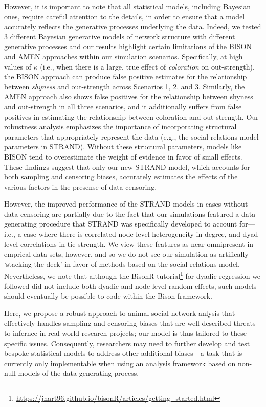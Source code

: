 \documentclass[Afour,sageh,times]{sagej}
\begin{document}
However, it is important to note that all statistical models, including Bayesian ones, require careful attention to the details, in order to ensure that a model accurately reflects the generative processes underlying the data. Indeed, we tested 3 different Bayesian generative models of network structure with different generative processes and our results highlight certain limitations of the BISON and AMEN approaches within our simulation scenarios. Specifically, at high values of $\kappa$ (i.e., when there is a large, true effect of \emph{coloration} on out-strength), the BISON approach can produce false positive estimates for the relationship between \emph{shyness} and out-strength across Scenarios 1, 2, and 3. Similarly, the AMEN approach also shows false positives for the relationship between shyness and out-strength in all three scenarios, and it additionally suffers from false positives in estimating the relationship between coloration and out-strength. Our robustness analysis emphasizes the importance of incorporating structural parameters that appropriately represent the data (e.g., the social relations model parameters in STRAND). Without these structural parameters, models like BISON tend to overestimate the weight of evidence in favor of small effects. These findings suggest that only our new STRAND model, which accounts for both sampling and censoring biases, accurately estimates the effects of the various factors in the presense of data censoring.

However, the improved performance of the STRAND models in cases without data censoring are partially due to the fact that our simulations featured a data generating procedure that STRAND was specifically developed to account for---i.e., a case where there is correlated node-level heterogeneity in degree, and dyad-level correlations in tie strength. We view these features as near omnipresent in emprical data-sets, however, and so we do not see our simulation as artifically `stacking the deck' in favor of methods based on the social relations model. Nevertheless, we note that although the BisonR tutorial\footnote{\url{https://jhart96.github.io/bisonR/articles/getting_started.html}} for dyadic regression we followed did not include both dyadic and node-level random effects, such models should eventually be possible to code within the Bison framework.   

Here, we propose a robust approach to animal social network anlysis that effectively handles sampling and censoring biases that are well-described threats-to-infernce in real-world research projects; our model is thus  tailored to these specific issues. Consequently, researchers may need to further develop and test bespoke statistical models to address other additional biases---a task that is currently only implementable when using an analysis framework based on non-null models of the data-generating process.
\end{document}
